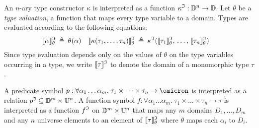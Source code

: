An $n$-ary type constructor $\kappa$ is interpreted as a function
$\kappa^{\mathfrak{I}} : \mathbb{D}^n \to \mathbb{D}$.
Let $\theta$ be a {\em type valuation}, a function that maps every
type variable to a domain. Types are evaluated according to the following
equations:
\begin{align*}
\llbracket\alpha\rrbracket^{\mathfrak{I}}_{\theta} &\:\triangleq\: \theta(\alpha) &
\llbracket\kappa(\tau_1,\dots,\tau_n)\rrbracket^{\mathfrak{I}}_{\theta} &\:\triangleq\: \kappa^{\mathfrak{I}}(\llbracket\tau_1\rrbracket^{\mathfrak{I}}_{\theta},\,\dots,\,\llbracket\tau_n\rrbracket^{\mathfrak{I}}_{\theta})
\end{align*}
Since type evaluation depends only on the values of $\theta$
on the type variables occurring in a type, we write $\llbracket\tau\rrbracket^{\mathfrak{I}}$
to denote the domain of a monomorphic type $\tau$.

A predicate symbol $p : \forall \alpha_1\dots\alpha_m .\; \tau_1 \times \dots \times \tau_n
\to \omicron$ is interpreted as a relation
$\smash{p^{\mathfrak{I}}} \subseteq \mathbb{D}^m \times \mathbb{U}^n$.
A function symbol $f : \forall \alpha_1\dots\alpha_m .\; \tau_1 \times \dots \times \tau_n \to \tau$
is interpreted as a function
$f^{\mathfrak{I}}$ on $\mathbb{D}^m \times \mathbb{U}^n$ that
maps any $m$ domains $D_1,\dots,D_m$ and
any $n$ universe elements to an element of
$\llbracket\tau\rrbracket^{\mathfrak{I}}_\theta$ where $\theta$ maps each $\alpha_i$ to $D_i$.

